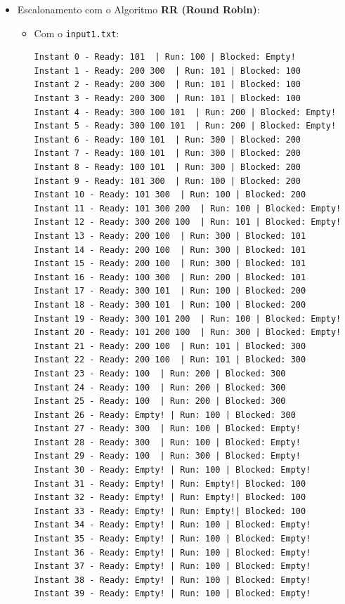 \documentclass[11pt]{article}   %
\begin{document}
\begin{itemize}
\begin{itemize}
\begin{verbatim}
        \end{verbatim}
    \end{itemize}
    \item Escalonamento com o Algoritmo \textbf{RR (Round Robin)}:
    \begin{itemize}
        \item Com o \verb|input1.txt|:
        \begin{verbatim}
Instant 0 - Ready: 101  | Run: 100 | Blocked: Empty!
Instant 1 - Ready: 200 300  | Run: 101 | Blocked: 100 
Instant 2 - Ready: 200 300  | Run: 101 | Blocked: 100 
Instant 3 - Ready: 200 300  | Run: 101 | Blocked: 100 
Instant 4 - Ready: 300 100 101  | Run: 200 | Blocked: Empty!
Instant 5 - Ready: 300 100 101  | Run: 200 | Blocked: Empty!
Instant 6 - Ready: 100 101  | Run: 300 | Blocked: 200 
Instant 7 - Ready: 100 101  | Run: 300 | Blocked: 200 
Instant 8 - Ready: 100 101  | Run: 300 | Blocked: 200 
Instant 9 - Ready: 101 300  | Run: 100 | Blocked: 200 
Instant 10 - Ready: 101 300  | Run: 100 | Blocked: 200 
Instant 11 - Ready: 101 300 200  | Run: 100 | Blocked: Empty!
Instant 12 - Ready: 300 200 100  | Run: 101 | Blocked: Empty!
Instant 13 - Ready: 200 100  | Run: 300 | Blocked: 101 
Instant 14 - Ready: 200 100  | Run: 300 | Blocked: 101 
Instant 15 - Ready: 200 100  | Run: 300 | Blocked: 101 
Instant 16 - Ready: 100 300  | Run: 200 | Blocked: 101 
Instant 17 - Ready: 300 101  | Run: 100 | Blocked: 200 
Instant 18 - Ready: 300 101  | Run: 100 | Blocked: 200 
Instant 19 - Ready: 300 101 200  | Run: 100 | Blocked: Empty!
Instant 20 - Ready: 101 200 100  | Run: 300 | Blocked: Empty!
Instant 21 - Ready: 200 100  | Run: 101 | Blocked: 300 
Instant 22 - Ready: 200 100  | Run: 101 | Blocked: 300 
Instant 23 - Ready: 100  | Run: 200 | Blocked: 300 
Instant 24 - Ready: 100  | Run: 200 | Blocked: 300 
Instant 25 - Ready: 100  | Run: 200 | Blocked: 300 
Instant 26 - Ready: Empty! | Run: 100 | Blocked: 300 
Instant 27 - Ready: 300  | Run: 100 | Blocked: Empty!
Instant 28 - Ready: 300  | Run: 100 | Blocked: Empty!
Instant 29 - Ready: 100  | Run: 300 | Blocked: Empty!
Instant 30 - Ready: Empty! | Run: 100 | Blocked: Empty!
Instant 31 - Ready: Empty! | Run: Empty!| Blocked: 100 
Instant 32 - Ready: Empty! | Run: Empty!| Blocked: 100 
Instant 33 - Ready: Empty! | Run: Empty!| Blocked: 100 
Instant 34 - Ready: Empty! | Run: 100 | Blocked: Empty!
Instant 35 - Ready: Empty! | Run: 100 | Blocked: Empty!
Instant 36 - Ready: Empty! | Run: 100 | Blocked: Empty!
Instant 37 - Ready: Empty! | Run: 100 | Blocked: Empty!
Instant 38 - Ready: Empty! | Run: 100 | Blocked: Empty!
Instant 39 - Ready: Empty! | Run: 100 | Blocked: Empty!            
        \end{verbatim}
    \end{itemize}
\end{itemize}
\end{document}
